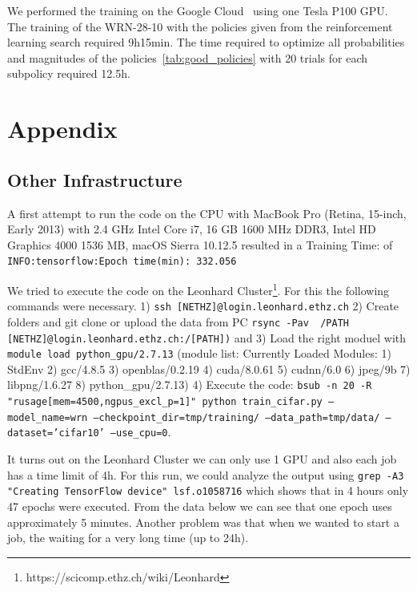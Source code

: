 \documentclass[10pt,twocolumn,letterpaper]{article}
\begin{document}
We performed the training on the Google Cloud~\cite{GCloud} using one Tesla P100 GPU. The training of the WRN-28-10 with the policies given from the reinforcement learning search required 9h15min. The time required to optimize all probabilities and magnitudes of the policies~\ref{tab:good_policies} with 20 trials for each subpolicy required 12.5h. \newline



\section{Appendix}

\subsection{Other Infrastructure}
A first attempt to run the code on the CPU with MacBook Pro (Retina, 15-inch, Early 2013) with 2.4 GHz Intel Core i7, 16 GB 1600 MHz DDR3, Intel HD Graphics 4000 1536 MB, macOS Sierra 10.12.5 resulted in a Training Time: of \texttt{INFO:tensorflow:Epoch time(min): 332.056} \newline

We tried to execute the code on the Leonhard Cluster\footnote{https://scicomp.ethz.ch/wiki/Leonhard}. For this the following commands were necessary. 1) \texttt{ssh [NETHZ]@login.leonhard.ethz.ch} 2) Create folders and git clone or upload the data from PC \texttt{rsync -Pav ~/PATH [NETHZ]@login.leonhard.ethz.ch:/[PATH])} and 3) Load the right moduel with \texttt{module load python\_gpu/2.7.13} (module list: Currently Loaded Modules: 1) StdEnv   2) gcc/4.8.5   3) openblas/0.2.19   4) cuda/8.0.61   5) cudnn/6.0   6) jpeg/9b   7) libpng/1.6.27   8) python\_gpu/2.7.13) 4) Execute the code: \texttt{bsub -n 20 -R "rusage[mem=4500,ngpus\_excl\_p=1]" python train\_cifar.py --model\_name=wrn --checkpoint\_dir=tmp/training/ --data\_path=tmp/data/ --dataset='cifar10' --use\_cpu=0}. \newline

It turns out on the Leonhard Cluster we can only use 1 GPU and also each job has a time limit of 4h. For this run, we could analyze the output using \texttt{grep -A3 "Creating TensorFlow device" lsf.o1058716} which shows that in 4 hours only 47 epochs were executed. From the data below we can see that one epoch uses approximately 5 minutes. Another problem was that when we wanted to start a job, the waiting for a very long time (up to 24h). \newline
\end{document}

